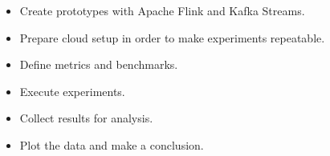 \begin{itemize}
    \item Create prototypes with Apache Flink and Kafka Streams.
    \item Prepare cloud setup in order to make experiments repeatable.
    \item Define metrics and benchmarks.
    \item Execute experiments.
    \item Collect results for analysis.
    \item Plot the data and make a conclusion.
\end{itemize}


%
%
%
%


